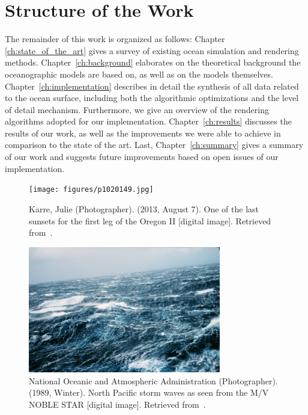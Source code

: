 \section{Structure of the Work}
\label{sec:structure}
The remainder of this work is organized as follows: Chapter
\ref{ch:state_of_the_art} gives a survey of existing ocean simulation and
rendering methods. Chapter~\ref{ch:background} elaborates on the theoretical
background the oceanographic models are based on, as well as on the models
themselves. Chapter~\ref{ch:implementation} describes in detail the
synthesis of all data related to the ocean surface, including both the algorithmic
optimizations and the level of detail mechanism. Furthermore, we give an overview
of the rendering algorithms adopted for our implementation.
Chapter~\ref{ch:results} discusses the results of our work, as well as
the improvements we were able to achieve in comparison to the state of the art.
Last, Chapter~\ref{ch:summary} gives a summary of our work and suggests
future improvements based on open issues of our implementation.
%
%
\begin{figure}
\centering
\texttt{[image: figures/p1020149.jpg]}
\caption{
	Karre, Julie (Photographer).
	(2013, August 7).
	One of the last sunsets for the first leg of the Oregon II [digital image].
	Retrieved from~\citet{misc:noaa:sunset}.
	}
\label{fig:ocean:sunset}
\end{figure}
\begin{figure}
\centering
\includegraphics[width=0.75\textwidth]{figures/wea00816.jpg}
\caption{
	National Oceanic and Atmospheric Administration (Photographer).
	(1989, Winter).
	North Pacific storm waves as seen from the M/V NOBLE STAR [digital image].
	Retrieved from~\citet{misc:noaa:storm}.
	}
\label{fig:ocean:storm}
\end{figure}
